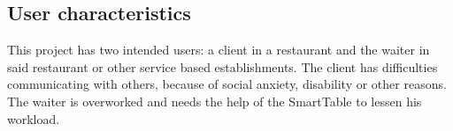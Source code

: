 \documentclass{article}
\begin{document}
\subsection{User characteristics}
This project has two intended users: a client in a restaurant and the waiter in said restaurant or other service based establishments.
The client has difficulties communicating with others, because of social anxiety, disability or other reasons. The waiter is overworked and
needs the help of the SmartTable to lessen his workload.
\end{document}
